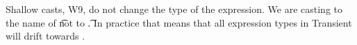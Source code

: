 \documentclass[a4paper,UKenglish,final]{tex/lipics-v2016}
\begin{document}
Shallow casts, W9, do not change the type of the expression. We are casting
to the name of \t not to \t.  In practice that means that all expression
types in Transient will drift towards \any.

\hrulefill

\begin{mathpar}











\end{mathpar}



\end{document}
